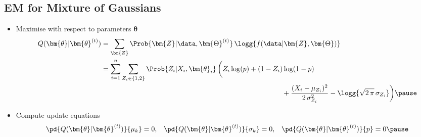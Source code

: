 
\begin{slide}
\section{EM for Mixture of Gaussians}

\begin{PauseHighLight}
  \begin{itemize}
  \item Maximise with respect to parameters $\bm{\theta}$
    {\small
      \begin{align*}
      Q(\bm{\theta}|\bm{\theta}^{(t)})
      &= \sum_{\bm{Z}} \Prob{\bm{Z}|\data,\bm{\Theta}^{(t)}}\,
        \logg{f(\data|\bm{Z}, \bm{\Theta})} \\
      &=\sum_{i=1}^n \sum_{Z_i\in\{1,2\}} \Prob{Z_i|X_i,\bm{\theta}_i}\,
        \biggl( Z_i \log(p) + (1-Z_i)\log(1-p) \\
        & \hspace{9cm}  +
        \frac{(X_i-\mu_{Z_i})^2}{2\,\sigma^2_{Z_i}} - \logg{\sqrt{2\,\pi}\,\sigma_{Z_i}} \biggr)\pause
    \end{align*} }
  \item Compute update equations
    \begin{align*}
      \pd{Q(\bm{\theta}|\bm{\theta}^{(t)})}{\mu_k}=0,
      &&
         \pd{Q(\bm{\theta}|\bm{\theta}^{(t)})}{\sigma_k}=0,
      &&
          \pd{Q(\bm{\theta}|\bm{\theta}^{(t)})}{p}=0\pause
    \end{align*}
  \end{itemize}
\end{PauseHighLight}

\end{slide}


